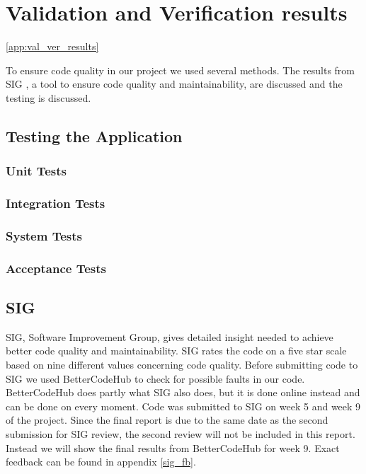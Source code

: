 \chapter{Validation and Verification results}\ref{app:val_ver_results}

To ensure code quality in our project we used several methods. The results from SIG \cite{sig}, a tool to ensure code quality and maintainability, are discussed and the testing is discussed.


\section{Testing the Application}

\subsection{Unit Tests}

\subsection{Integration Tests}

\subsection{System Tests}

\subsection{Acceptance Tests}

\section{SIG}
SIG, Software Improvement Group, gives detailed insight needed to achieve better code quality and maintainability. SIG rates the code on a five star scale based on nine different values concerning code quality. Before submitting code to SIG we used BetterCodeHub\cite{better_code_hub} to check for possible faults in our code. BetterCodeHub does partly what SIG also does, but it is done online instead and can be done on every moment. Code was submitted to SIG on week 5 and week 9 of the project. Since the final report is due to the same date as the second submission for SIG review, the second review will not be included in this report. Instead we will show the final results from BetterCodeHub for week 9. Exact feedback can be found in appendix \ref{sig_fb}.


